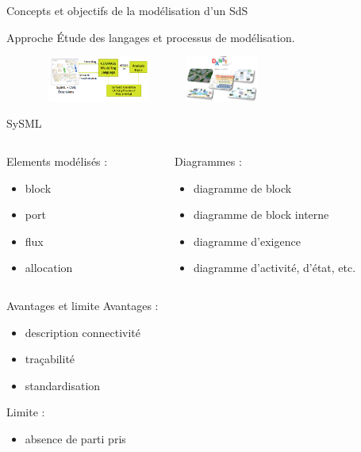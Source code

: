 \begin{frame}{Concepts et objectifs de la modélisation d'un SdS}
\begin{block}{Approche}
\centering
Étude des langages et processus de modélisation.
\begin{figure} 
\includegraphics[width=4cm, height=1.5cm]{imgs/compass.png}
\hspace{0.5cm}
\includegraphics[width=4cm, height=1.5cm]{imgs/danse.png}
\end{figure}
\end{block} 

\end{frame}

\begin{frame}{SySML}
\begin{columns}
\begin{column}{0.5\textwidth}
Elements modélisés : 
\begin{itemize}
\item block
\item port
\item flux
\item allocation
\end{itemize}
\end{column}
\begin{column}{0.5\textwidth}
Diagrammes : 
\begin{itemize}
\item diagramme de block
\item diagramme de block interne
\item diagramme d'exigence
\item diagramme d'activité, d'état, etc.
\end{itemize}
\end{column}
\end{columns}
\begin{block}{Avantages et limite}
Avantages : 
\begin{itemize}
\item description connectivité
\item traçabilité
\item standardisation
\end{itemize}
Limite :
\begin{itemize}
\item absence de parti pris
\end{itemize}
\end{block}
\end{frame}

